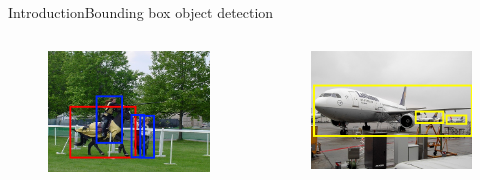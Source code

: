 \begin{frame}{Introduction}{Bounding box object detection}
    \begin{columns}
            \begin{figure}
                \includegraphics[width=1.0 \textwidth]{figs/objdetex1.jpg}
            \end{figure}
        \begin{figure}
            \includegraphics[width=1.0 \textwidth]{figs/objdetex3.jpg}
        \end{figure}
    \end{columns}
\end{frame}

